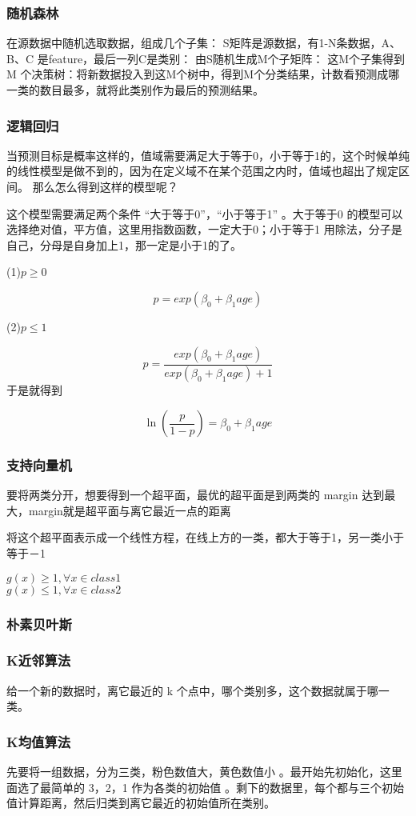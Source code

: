 \subsubsection{随机森林}
在源数据中随机选取数据，组成几个子集：
S矩阵是源数据，有1-N条数据，A、B、C 是feature，最后一列C是类别：
由S随机生成M个子矩阵：
这M个子集得到 M 个决策树：将新数据投入到这M个树中，得到M个分类结果，计数看预测成哪一类的数目最多，就将此类别作为最后的预测结果。
\subsubsection{逻辑回归}
当预测目标是概率这样的，值域需要满足大于等于0，小于等于1的，这个时候单纯的线性模型是做不到的，因为在定义域不在某个范围之内时，值域也超出了规定区间。
那么怎么得到这样的模型呢？

这个模型需要满足两个条件 “大于等于0”，“小于等于1” 。大于等于0 的模型可以选择绝对值，平方值，这里用指数函数，一定大于0；小于等于1 用除法，分子是自己，分母是自身加上1，那一定是小于1的了。

(1)\(p \geq 0\)

\[p=exp(\beta_0+\beta_1 age)\]

(2)\(p\leq 1\)

\[p=\frac{exp(\beta_0+\beta_1age)}{exp(\beta_0+\beta_1age)+1}\]
于是就得到

\[\ln \left(\frac{p}{1-p}\right)=\beta_0+\beta_1age\]
\subsubsection{支持向量机}
要将两类分开，想要得到一个超平面，最优的超平面是到两类的 margin 达到最大，margin就是超平面与离它最近一点的距离

将这个超平面表示成一个线性方程，在线上方的一类，都大于等于1，另一类小于等于－1

\(g(x)\geq 1,\forall x \in class 1\)\\
\(g(x)\leq 1,\forall x \in class2\)
\subsubsection{朴素贝叶斯}
\subsubsection{K近邻算法}
给一个新的数据时，离它最近的 k 个点中，哪个类别多，这个数据就属于哪一类。
\subsubsection{K均值算法}
先要将一组数据，分为三类，粉色数值大，黄色数值小 。最开始先初始化，这里面选了最简单的 3，2，1 作为各类的初始值 。剩下的数据里，每个都与三个初始值计算距离，然后归类到离它最近的初始值所在类别。

